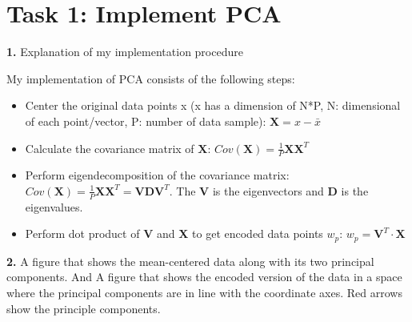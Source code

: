 \setlength\intextsep{1mm}

\section*{\textbf{Task 1: Implement PCA}}

\textbf{1.} Explanation of my implementation procedure

My implementation of PCA consists of the following steps:
\begin{itemize}
    \item Center the original data points x (x has a dimension of N*P, N: dimensional of each point/vector, P: number of data sample): $\textbf{X} = x - \bar{x}$
    \item Calculate the covariance matrix of $\textbf{X}$: $ Cov(\textbf{X}) = \frac{1}{P} \textbf{X} \textbf{X}^T $
    \item Perform eigendecomposition of the covariance matrix: $ Cov(\textbf{X}) = \frac{1}{P} \textbf{X} \textbf{X}^T = \textbf{V} \textbf{D} \textbf{V}^T$. The \textbf{V} is the eigenvectors and \textbf{D} is the eigenvalues.
    \item Perform dot product of \textbf{V} and \textbf{X} to get encoded data points $ w_p $: $ w_p = \textbf{V}^T \cdot \textbf{X}$
\end{itemize}


\textbf{2.} A figure that shows the mean-centered data along with its two principal components. And A figure that shows the encoded version of the data in a space where the principal components are in line with the coordinate axes. Red arrows show the principle components.

